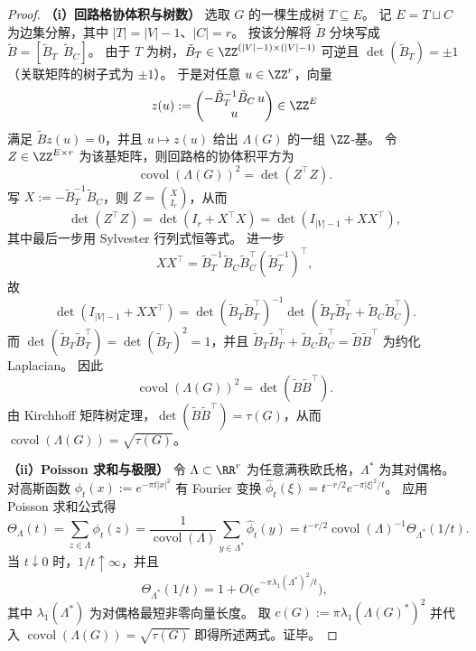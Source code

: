 \begin{proof}
\textbf{（i）回路格协体积与树数）}
选取 \(G\) 的一棵生成树 \(T\subseteq E\)。
记 \(E= T\sqcup C\) 为边集分解，其中 \(|T|=|V|-1\)、\(|C|=r\)。
按该分解将 \(\tilde B\) 分块写成
\(
\tilde B=[\tilde B_T\ \ \tilde B_C]
\)。
由于 \(T\) 为树，\(\tilde B_T\in\ZZ^{(|V|-1)\times(|V|-1)}\) 可逆且 \(\det(\tilde B_T)=\pm 1\)（关联矩阵的树子式为 \(\pm 1\)）。
于是对任意 \(u\in\ZZ^{r}\)，向量
\[
z(u):=\begin{pmatrix}
 -\tilde B_T^{-1}\tilde B_C\,u\\
 u
\end{pmatrix}\in\ZZ^{E}
\]
满足 \(\tilde B z(u)=0\)，并且 \(u\mapsto z(u)\) 给出 \(\Lambda(G)\) 的一组 \(\ZZ\)-基。
令 \(Z\in\ZZ^{E\times r}\) 为该基矩阵，则回路格的协体积平方为
\[
\operatorname{covol}(\Lambda(G))^2=\det(Z^\top Z).
\]
写 \(X:=-\tilde B_T^{-1}\tilde B_C\)，则 \(Z=\binom{X}{I_r}\)，从而
\[
\det(Z^\top Z)=\det(I_r+X^\top X)=\det(I_{|V|-1}+XX^\top),
\]
其中最后一步用 Sylvester 行列式恒等式。
进一步
\[
XX^\top=\tilde B_T^{-1}\tilde B_C\tilde B_C^\top(\tilde B_T^{-1})^\top,
\]
故
\[
\det(I_{|V|-1}+XX^\top)
=\det(\tilde B_T\tilde B_T^\top)^{-1}\det(\tilde B_T\tilde B_T^\top+\tilde B_C\tilde B_C^\top).
\]
而 \(\det(\tilde B_T\tilde B_T^\top)=\det(\tilde B_T)^2=1\)，并且
\(
\tilde B_T\tilde B_T^\top+\tilde B_C\tilde B_C^\top=\tilde B\tilde B^\top
\)
为约化 Laplacian。
因此
\[
\operatorname{covol}(\Lambda(G))^2=\det(\tilde B\tilde B^\top).
\]
由 Kirchhoff 矩阵树定理，\(\det(\tilde B\tilde B^\top)=\tau(G)\)，从而
\(
\operatorname{covol}(\Lambda(G))=\sqrt{\tau(G)}
\)。

\textbf{（ii）Poisson 求和与极限）}
令 \(\Lambda\subset\RR^{r}\) 为任意满秩欧氏格，\(\Lambda^\ast\) 为其对偶格。
对高斯函数 \(\phi_t(x):=e^{-\pi t|x|^2}\) 有 Fourier 变换 \(\widehat\phi_t(\xi)=t^{-r/2}e^{-\pi|\xi|^2/t}\)。
应用 Poisson 求和公式得
\[
\Theta_\Lambda(t)=\sum_{z\in\Lambda}\phi_t(z)
=\frac{1}{\operatorname{covol}(\Lambda)}\sum_{y\in\Lambda^\ast}\widehat\phi_t(y)
=t^{-r/2}\operatorname{covol}(\Lambda)^{-1}\Theta_{\Lambda^\ast}(1/t).
\]
当 \(t\downarrow 0\) 时，\(1/t\uparrow\infty\)，并且
\[
\Theta_{\Lambda^\ast}(1/t)=1+O\bigl(e^{-\pi \lambda_1(\Lambda^\ast)^2/t}\bigr),
\]
其中 \(\lambda_1(\Lambda^\ast)\) 为对偶格最短非零向量长度。
取 \(c(G):=\pi\lambda_1(\Lambda(G)^\ast)^2\) 并代入 \(\operatorname{covol}(\Lambda(G))=\sqrt{\tau(G)}\) 即得所述两式。证毕。
\end{proof}



